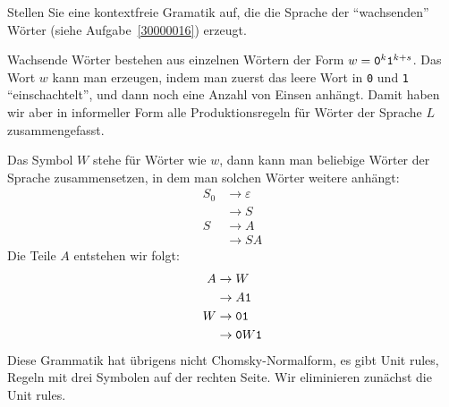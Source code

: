 Stellen Sie eine kontextfreie Gramatik auf, die die Sprache der ``wachsenden''
Wörter  (siehe Aufgabe~\ref{30000016}) erzeugt.

\begin{loesung}
Wachsende Wörter bestehen aus einzelnen Wörtern der Form
$w={\tt 0}^k{\tt 1}^{k+s}$.  Das Wort $w$ kann man erzeugen,
indem man zuerst das leere Wort in {\tt 0} und {\tt 1}
``einschachtelt'', und dann noch eine Anzahl von Einsen anhängt.
Damit haben wir aber in informeller Form alle Produktionsregeln
für Wörter der Sprache $L$ zusammengefasst.

Das Symbol $W$ stehe für Wörter wie $w$, dann kann man beliebige Wörter der
Sprache zusammensetzen, in dem man solchen Wörter weitere anhängt:
\begin{align*}
S_0&\to \varepsilon\\
   &\to S\\
S&\to A\\
 &\to SA
\end{align*}
Die Teile $A$ entstehen wir folgt:
\begin{align*}
A&\to W\\
 &\to A{\tt 1}\\
W&\to {\tt01}\\
 &\to {\tt 0}W{\tt 1}\\
\end{align*}
Diese Grammatik hat übrigens nicht Chomsky-Normalform, es gibt Unit rules,
Regeln mit drei Symbolen auf der rechten Seite. Wir eliminieren zunächst
die Unit rules.


\end{loesung}
